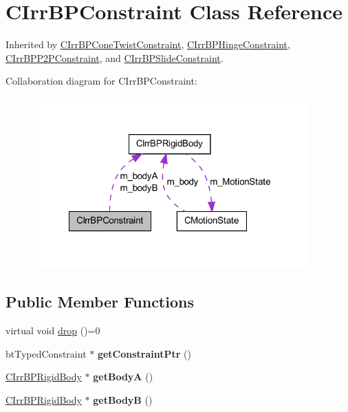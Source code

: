 \hypertarget{class_c_irr_b_p_constraint}{
\section{CIrrBPConstraint Class Reference}
\label{class_c_irr_b_p_constraint}
}


Inherited by \hyperlink{class_c_irr_b_p_cone_twist_constraint}{CIrrBPConeTwistConstraint}, \hyperlink{class_c_irr_b_p_hinge_constraint}{CIrrBPHingeConstraint}, \hyperlink{class_c_irr_b_p_p2_p_constraint}{CIrrBPP2PConstraint}, and \hyperlink{class_c_irr_b_p_slide_constraint}{CIrrBPSlideConstraint}.



Collaboration diagram for CIrrBPConstraint:\nopagebreak
\begin{figure}[H]
\begin{center}
\leavevmode
\includegraphics[width=300pt]{class_c_irr_b_p_constraint__coll__graph}
\end{center}
\end{figure}
\subsection*{Public Member Functions}
\begin{DoxyCompactItemize}
\item 
virtual void \hyperlink{class_c_irr_b_p_constraint_a2718ef7118d60646a5cfa2dfe5a44795}{drop} ()=0
\item 
\hypertarget{class_c_irr_b_p_constraint_acfb5d4e8b25c91e150af372f4bd9187e}{
btTypedConstraint $\ast$ {\bfseries getConstraintPtr} ()}
\label{class_c_irr_b_p_constraint_acfb5d4e8b25c91e150af372f4bd9187e}

\item 
\hypertarget{class_c_irr_b_p_constraint_ac109e0c136271d9c002c5521a2eacc15}{
\hyperlink{class_c_irr_b_p_rigid_body}{CIrrBPRigidBody} $\ast$ {\bfseries getBodyA} ()}
\label{class_c_irr_b_p_constraint_ac109e0c136271d9c002c5521a2eacc15}

\item 
\hypertarget{class_c_irr_b_p_constraint_a0774899cfd927b7dcf7d1ab45552c122}{
\hyperlink{class_c_irr_b_p_rigid_body}{CIrrBPRigidBody} $\ast$ {\bfseries getBodyB} ()}
\label{class_c_irr_b_p_constraint_a0774899cfd927b7dcf7d1ab45552c122}

\end{DoxyCompactItemize}
